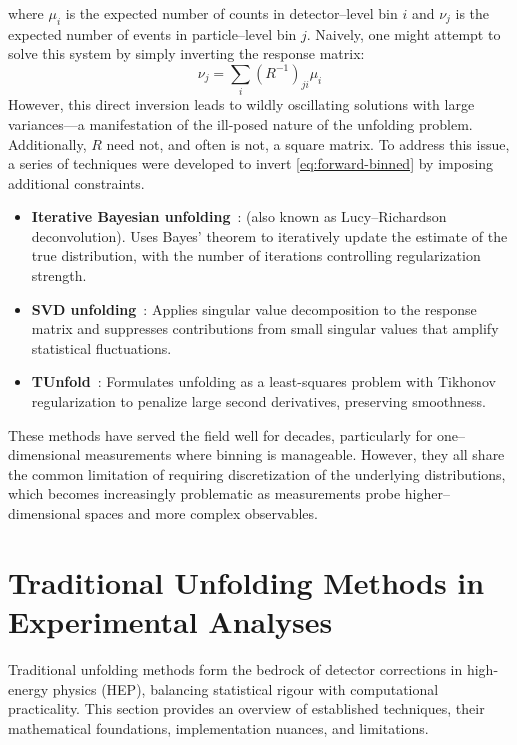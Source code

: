     where \(\mu_{i}\) is the expected number of counts in detector--level bin \(i\) and \(\nu_{j}\) is the expected number of events in particle--level bin $j$.
    Naively, one might attempt to solve this system by simply inverting the response matrix:
    \begin{equation}
        \nu_j = \sum_i (R^{-1})_{ji} \mu_i
    \end{equation}
    However, this direct inversion leads to wildly oscillating solutions with large variances---a manifestation of the ill-posed nature of the unfolding problem.
    Additionally, \(R\) need not, and often is not, a square matrix.
    To address this issue, a series of techniques were developed to invert \cref{eq:forward-binned} by imposing additional constraints.
    \begin{itemize}
    \item \textbf{Iterative Bayesian unfolding}~\cite{richardson_bayesian-based_1972, lucy_iterative_1974, Schmitt2017DataPhysics}: (also known as Lucy--Richardson deconvolution). Uses Bayes' theorem to iteratively update the estimate of the true distribution, with the number of iterations controlling regularization strength.
    \item \textbf{SVD unfolding}~\cite{hocker_svd_1996}: Applies singular value decomposition to the response matrix and suppresses contributions from small singular values that amplify statistical fluctuations.
    \item \textbf{TUnfold}~\cite{schmitt_tunfold_2012}: Formulates unfolding as a least-squares problem with Tikhonov regularization to penalize large second derivatives, preserving smoothness.
    \end{itemize}

These methods have served the field well for decades, particularly for one--dimensional measurements where binning is manageable.
%
However, they all share the common limitation of requiring discretization of the underlying distributions, which becomes increasingly problematic as measurements probe higher--dimensional spaces and more complex observables.


\section{Traditional Unfolding Methods in Experimental Analyses}
\label{sec:binned-methods}
Traditional unfolding methods form the bedrock of detector corrections in high-energy physics (HEP), balancing statistical rigour with computational practicality.
%
This section provides an overview of established techniques, their mathematical foundations, implementation nuances, and limitations.

